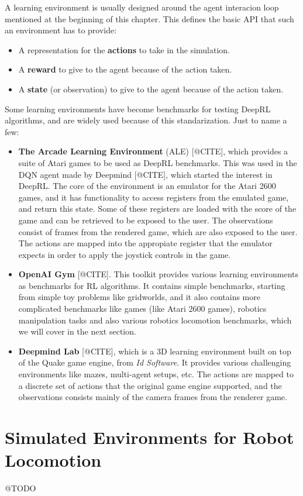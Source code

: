 A learning environment is usually designed around the agent interacion loop mentioned
at the beginning of this chapter. This defines the basic API that such an environment
has to provide:

\begin{itemize}
    \item A representation for the \textbf{actions} to take in the simulation.
    \item A \textbf{reward} to give to the agent because of the action taken.
    \item A \textbf{state} (or observation) to give to the agent because of the action taken.
\end{itemize}

Some learning environments have become benchmarks for testing DeepRL algorithms, and
are widely used because of this standarization. Just to name a few:

\begin{itemize}
    \item \textbf{The Arcade Learning Environment} (ALE) [@CITE], which provides a suite
           of Atari games to be used as DeepRL benchmarks. This was used in the DQN
           agent made by Deepmind [@CITE], which started the interest in DeepRL.
           The core of the environment is an emulator for the Atari 2600 games, and
           it has functionality to access registers from the emulated game, and return
           this state. Some of these registers are loaded with the score of the game
           and can be retrieved to be exposed to the user. The observations consist
           of frames from the rendered game, which are also exposed to the user. The actions
           are mapped into the appropiate register that the emulator expects in order
           to apply the joystick controls in the game.

           \figALEgames

    \item \textbf{OpenAI Gym} [@CITE]. This toolkit provides various learning environments
           as benchmarks for RL algorithms. It contains simple benchmarks, starting from simple
           toy problems like gridworlds, and it also contains more complicated benchmarks like
           games (like Atari 2600 games), robotics manipulation tasks and also various
           robotics locomotion benchmarks, which we will cover in the next section.

           \figOpenAIEnvs

    \item \textbf{Deepmind Lab} [@CITE], which is a 3D learning environment built on top
           of the Quake game engine, from \textit{Id Software}. It provides various challenging
           environments like mazes, multi-agent setups, etc. The actions are mapped to a discrete
           set of actions that the original game engine supported, and the observations consists
           mainly of the camera frames from the renderer game.
\end{itemize}

\section{Simulated Environments for Robot Locomotion}

@TODO

